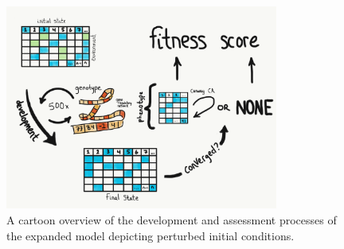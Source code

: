 \begin{figure}
    \centering
    \includegraphics[width=0.8\textwidth]{img/complete_schematic_perturbed}
 	\captionsetup{singlelinecheck=off,justification=raggedright}
  	\caption{A cartoon overview of the development and assessment processes of the expanded model depicting perturbed initial conditions.}
    \label{fig:complete_schematic}
\end{figure}